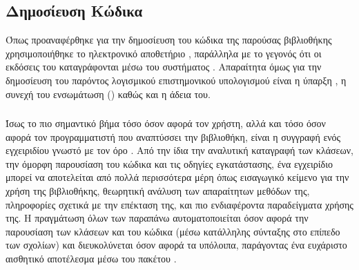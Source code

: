 \subsection{Δημοσίευση Κώδικα}
Όπως προαναφέρθηκε για την δημοσίευση του κώδικα της παρούσας βιβλιοθήκης χρησιμοποιήθηκε το ηλεκτρονικό αποθετήριο \href{https://github.com/}{}, παράλληλα με το γεγονός ότι οι εκδόσεις του καταγράφονται μέσω του συστήματος .
Απαραίτητα όμως για την δημοσίευση του παρόντος λογισμικού επιστημονικού υπολογισμού  είναι η ύπαρξη , η συνεχή του ενσωμάτωση () καθώς και η άδεια του.
\subsubsection{}
Ίσως το πιο σημαντικό βήμα τόσο όσον αφορά τον χρήστη, αλλά και τόσο όσον αφορά τον προγραμματιστή που αναπτύσσει την βιβλιοθήκη, είναι η συγγραφή ενός εγχειριδίου γνωστό με τον όρο \textit{}.
Από την ίδια την αναλυτική καταγραφή των κλάσεων, την όμορφη παρουσίαση του κώδικα και τις οδηγίες εγκατάστασης, ένα εγχειρίδιο μπορεί να αποτελείται από πολλά περισσότερα μέρη όπως εισαγωγικό κείμενο για την χρήση της βιβλιοθήκης, θεωρητική ανάλυση των απαραίτητων μεθόδων της, πληροφορίες σχετικά με την επέκταση της, και πιο ενδιαφέροντα παραδείγματα χρήσης της.
Η πραγμάτωση όλων των παραπάνω αυτοματοποιείται όσον αφορά την παρουσίαση των κλάσεων και του κώδικα (μέσω κατάλληλης σύνταξης στο επίπεδο των σχολίων) και διευκολύνεται όσον αφορά τα υπόλοιπα, παράγοντας ένα ευχάριστο αισθητικό αποτέλεσμα μέσω του πακέτου \href{https://pypi.org/project/Sphinx/}{}.
